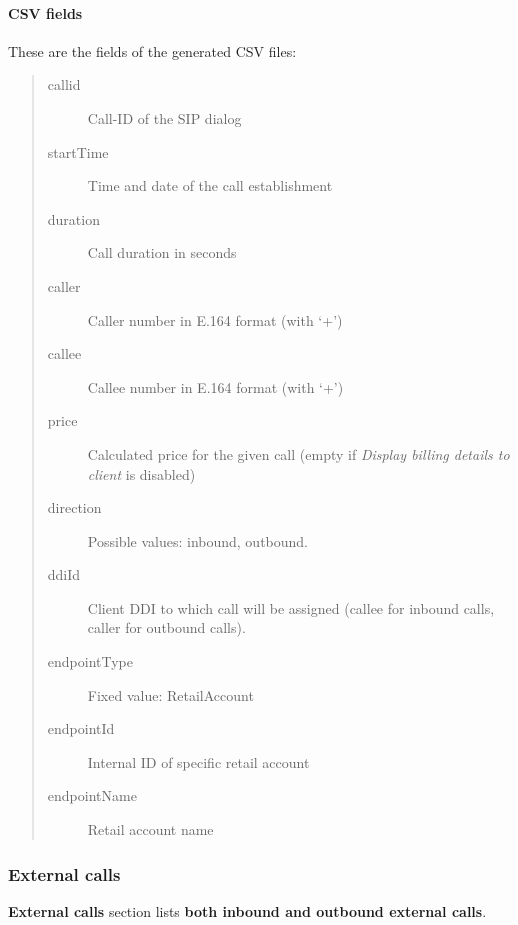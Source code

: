 \documentclass[letterpaper,10pt,english]{sphinxmanual}
\begin{document}
\paragraph{CSV fields}
\label{administration_portal/client/retail/calls/call_csv_schedulers:csv-fields}
These are the fields of the generated CSV files:
\begin{quote}
\begin{description}
\item[{callid}] \leavevmode
Call-ID of the SIP dialog

\item[{startTime}] \leavevmode
Time and date of the call establishment

\item[{duration}] \leavevmode
Call duration in seconds

\item[{caller}] \leavevmode
Caller number in E.164 format (with `+')

\item[{callee}] \leavevmode
Callee number in E.164 format (with `+')

\item[{price}] \leavevmode
Calculated price for the given call (empty if \emph{Display billing details to client} is disabled)

\item[{direction}] \leavevmode
Possible values: inbound, outbound.

\item[{ddiId}] \leavevmode
Client DDI to which call will be assigned (callee for inbound calls, caller for outbound calls).

\item[{endpointType}] \leavevmode
Fixed value: RetailAccount

\item[{endpointId}] \leavevmode
Internal ID of specific retail account

\item[{endpointName}] \leavevmode
Retail account name

\end{description}
\end{quote}


\subsubsection{External calls}
\label{administration_portal/client/retail/calls/call_recordings::doc}\label{administration_portal/client/retail/calls/call_recordings:external-calls}
\textbf{External calls} section lists \textbf{both inbound and outbound external calls}.
\end{document}

